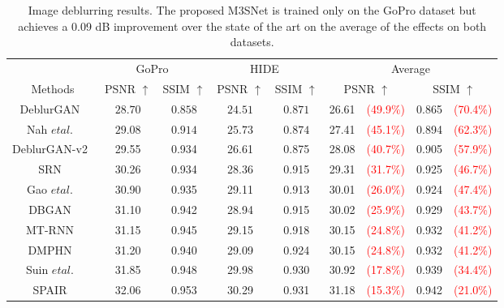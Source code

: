 \documentclass[sn-mathphys,Numbered]{sn-jnl}
\theoremstyle{thmstyleone}\newtheorem{theorem}{Theorem}\newtheorem{proposition}[theorem]{Proposition}
\theoremstyle{thmstyletwo}\newtheorem{example}{Example}\newtheorem{remark}{Remark}
\theoremstyle{thmstylethree}\newtheorem{definition}{Definition}
\begin{document}
\begin{table}[ht]
\caption{Image deblurring results. The proposed M3SNet is trained only on the GoPro dataset but achieves a 0.09 dB improvement over the state of the art on the average of the effects on both datasets. \label{tb:02}}

\begin{tabular}{ccccc||cccc}
    \hline
    \multicolumn{1}{c}{} & \multicolumn{2}{c}{GoPro~\cite{Gopro}}  & \multicolumn{2}{c||}{HIDE~\cite{HIDE}} & \multicolumn{4}{c}{Average}
    \\
   Methods & PSNR $\uparrow$ & SSIM $\uparrow$ & PSNR $\uparrow$ & SSIM $\uparrow$   & \multicolumn{2}{c}{ PSNR $\uparrow$} & \multicolumn{2}{c}{ SSIM $\uparrow$} 
    \\
    \hline\hline
    DeblurGAN~\cite{Degan}  & $28.70 $ & $0.858$ & $24.51$ & $0.871$& 26.61 &\textcolor{red}{(49.9\%)} &0.865 &\textcolor{red}{(70.4\%)}
    \\
    Nah $et al.$~\cite{Gopro} & $29.08$ & $0.914$ & $25.73$ & $0.874$& 27.41  &\textcolor{red}{(45.1\%)}  &0.894&\textcolor{red}{(62.3\%)}
    \\
    DeblurGAN-v2~\cite{deganv2} & 29.55 & 0.934 & 26.61 & 0.875& 28.08  &\textcolor{red}{(40.7\%)} &0.905&\textcolor{red}{(57.9\%)}
    \\
    SRN~\cite{2018Scale} & 30.26 & 0.934 & 28.36 & 0.915 &29.31  &\textcolor{red}{(31.7\%)} &0.925&\textcolor{red}{(46.7\%)}
    \\
    Gao $et al.$~\cite{Gao2019DynamicSD} & 30.90 & 0.935 & 29.11 & 0.913 &30.01  &\textcolor{red}{(26.0\%)} &0.924&\textcolor{red}{(47.4\%)}
    \\
    DBGAN~\cite{DBGAN} & 31.10 & 0.942 & 28.94 & 0.915 &30.02 &\textcolor{red}{(25.9\%)} &0.929&\textcolor{red}{(43.7\%)}
    \\
    MT-RNN~\cite{MTRNN} & 31.15 & 0.945 & 29.15 & 0.918 &30.15  &\textcolor{red}{(24.8\%)}&0.932&\textcolor{red}{(41.2\%)}
    \\
    DMPHN~\cite{Zhang_2019_CVPR} & 31.20 & 0.940 & 29.09 & 0.924 & 30.15  &\textcolor{red}{(24.8\%)}&0.932&\textcolor{red}{(41.2\%)}
    \\
    Suin $et al.$~\cite{Suin2020SpatiallyAttentivePN} & 31.85 & 0.948 & 29.98 & 0.930&30.92 &\textcolor{red}{(17.8\%)}&0.939&\textcolor{red}{(34.4\%)}
    \\
    SPAIR~\cite{SPAIR} & 32.06 & 0.953 & 30.29 & 0.931 &31.18  &\textcolor{red}{(15.3\%)}&0.942&\textcolor{red}{(21.0\%)}
    \\

\end{tabular}
\end{table}
\end{document}
